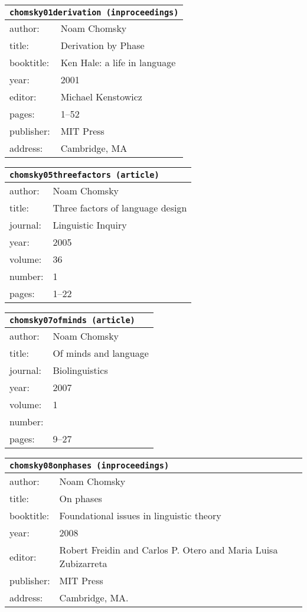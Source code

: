 \documentclass{article}
\begin{document}
\bigskip

\begin{tabular}{p{}p{}}
\multicolumn{2}{l}{\texttt{chomsky01derivation (inproceedings)}}\\
\hline
author: & Noam Chomsky\\
title: & Derivation by Phase\\
booktitle: & Ken Hale: a life in language\\
year: & 2001\\
editor: & Michael Kenstowicz\\
pages: & 1--52\\
publisher: & MIT Press\\
address: & Cambridge, MA\\
\end{tabular}

\bigskip

\begin{tabular}{p{}p{}}
\multicolumn{2}{l}{\texttt{chomsky05threefactors (article)}}\\
\hline
author: & Noam Chomsky\\
title: & Three factors of language design\\
journal: & Linguistic Inquiry\\
year: & 2005\\
volume: & 36\\
number: & 1\\
pages: & 1--22\\
\end{tabular}

\bigskip

\begin{tabular}{p{}p{}}
\multicolumn{2}{l}{\texttt{chomsky07ofminds (article)}}\\
\hline
author: & Noam Chomsky\\
title: & Of minds and language\\
journal: & Biolinguistics\\
year: & 2007\\
volume: & 1\\
number: & \\
pages: & 9--27\\
\end{tabular}

\bigskip

\begin{tabular}{p{}p{}}
\multicolumn{2}{l}{\texttt{chomsky08onphases (inproceedings)}}\\
\hline
author: & Noam Chomsky\\
title: & On phases\\
booktitle: & Foundational issues in linguistic theory\\
year: & 2008\\
editor: & Robert Freidin and Carlos P. Otero and Maria Luisa Zubizarreta\\
publisher: & MIT Press\\
address: & Cambridge, MA.\\
\end{tabular}
\end{document}
